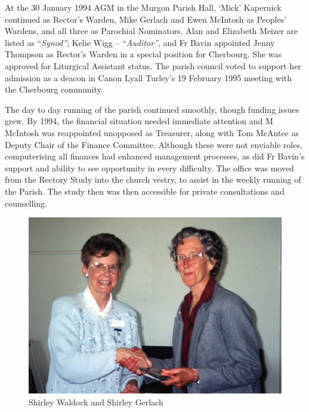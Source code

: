 At the 30 January 1994 AGM in the Murgon Parish Hall, `Mick' Kapernick continued as Rector's Warden, Mike Gerlach and Ewen McIntosh as Peoples' Wardens, and all three as Parochial Nominators. Alan and Elizabeth Meizer are listed as ``\emph{Synod''}; Kelie Wigg -- ``\emph{Auditor''}, and Fr Bavin appointed Jenny Thompson as Rector's Warden in a special position for Cherbourg. She was approved for Liturgical Assistant status. The parish council voted to support her admission as a deacon in Canon Lyall Turley's 19 February 1995 meeting with the Cherbourg community.



The day to day running of the parish continued smoothly, though funding issues grew. By 1994, the financial situation needed immediate attention and M McIntosh was reappointed unopposed as Treasurer, along with Tom McAntee as Deputy Chair of the Finance Committee. Although these were not enviable roles, computerising all finances had enhanced management processes, as did Fr Bavin's support and ability to see opportunity in every difficulty. The office was moved from the Rectory Study into the church vestry, to assist in the weekly running of the Parish. The study then was then accessible for private consultations and counselling.









\begin{figure}
\begin{center}
\includegraphics[width=1.\linewidth,center]{../images/waldockGerlach.jpg}
\caption{Shirley Waldock and Shirley Gerlach}
\end{center}
\end{figure}




